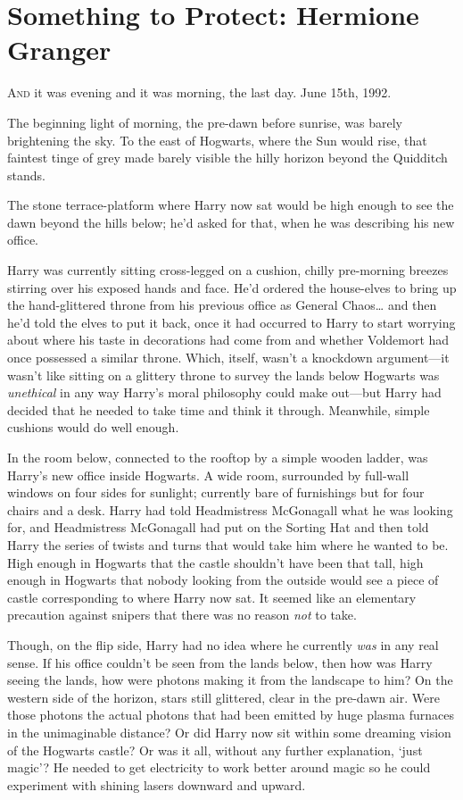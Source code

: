 \chapter{Something to Protect: Hermione Granger}

\lettrine{A}{nd} it was
evening and it was morning, the last day. June 15th, 1992.

\quad\quad
The beginning light of morning, the pre-dawn before sunrise, was barely
brightening the sky. To the east of Hogwarts, where the Sun would rise, that
faintest tinge of grey made barely visible the hilly horizon beyond the
Quidditch stands.

The stone terrace-platform where Harry now sat would be high enough to see the
dawn beyond the hills below; he'd asked for that, when he was describing his
new office.

Harry was currently sitting cross-legged on a cushion, chilly pre-morning
breezes stirring over his exposed hands and face. He'd ordered the house-elves
to bring up the hand-glittered throne from his previous office as General
Chaos{\ldots} and then he'd told the elves to put it back, once it had occurred
to Harry to start worrying about where his taste in decorations had come from
and whether Voldemort had once possessed a similar throne. Which, itself,
wasn't a knockdown argument---it wasn't like sitting on a glittery throne to
survey the lands below Hogwarts was \emph{unethical} in any way Harry's moral
philosophy could make out---but Harry had decided that he needed to take time
and think it through. Meanwhile, simple cushions would do well enough.

In the room below, connected to the rooftop by a simple wooden ladder, was
Harry's new office inside Hogwarts. A wide room, surrounded by full-wall
windows on four sides for sunlight; currently bare of furnishings but for four
chairs and a desk. Harry had told Headmistress McGonagall what he was looking
for, and Headmistress McGonagall had put on the Sorting Hat and then told Harry
the series of twists and turns that would take him where he wanted to be. High
enough in Hogwarts that the castle shouldn't have been that tall, high enough
in Hogwarts that nobody looking from the outside would see a piece of castle
corresponding to where Harry now sat. It seemed like an elementary precaution
against snipers that there was no reason \emph{not} to take.

Though, on the flip side, Harry had no idea where he currently \emph{was} in
any real sense. If his office couldn't be seen from the lands below, then how
was Harry seeing the lands, how were photons making it from the landscape to
him? On the western side of the horizon, stars still glittered, clear in the
pre-dawn air. Were those photons the actual photons that had been emitted by
huge plasma furnaces in the unimaginable distance? Or did Harry now sit within
some dreaming vision of the Hogwarts castle? Or was it all, without any further
explanation, `just magic'? He needed to get electricity to work better around
magic so he could experiment with shining lasers downward and upward.

